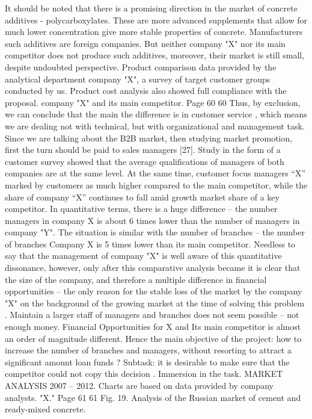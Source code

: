 It should be noted that there is a promising direction in the market of concrete additives
- polycarboxylates. These are more advanced supplements that allow for much
lower concentration give more stable properties of concrete. Manufacturers
such additives are foreign companies. But neither company "X" nor its main competitor
does not produce such additives, moreover, their market is still small, despite
undoubted perspective.
Product comparison data provided by the analytical department
company "X", a survey of target customer groups conducted by us.
Product cost analysis also showed full compliance with the proposal.
company "X" and its main competitor.
Page 60
60
Thus, by exclusion, we can conclude that the main
the difference is in customer service , which means we are dealing not with technical, but with
organizational and management task.
Since we are talking about the B2B market, then studying market promotion, first
the turn should be paid to sales managers [27]. Study
in the form of a customer survey showed that the average qualifications of managers of both
companies are at the same level. At the same time, customer focus
managers “X” marked by customers as much higher compared to
the main competitor, while the share of company “X” continues to fall amid growth
market share of a key competitor.
In quantitative terms, there is a huge difference -- the number
managers in company X is about 6 times lower than the number of managers in
company "Y". The situation is similar with the number of branches -- the number of branches
Company X is 5 times lower than its main competitor. Needless to say
that the management of company "X" is well aware of this quantitative
dissonance, however, only after this comparative analysis became
it is clear that the size of the company, and therefore a multiple difference in financial
opportunities -- the only reason for the stable loss of the market by the company "X" on
the background of the growing market at the time of solving this problem .
Maintain a larger staff of managers and branches does not seem
possible -- not enough money. Financial Opportunities for X and Its
main competitor is almost an order of magnitude different.
Hence the main objective of the project: how to increase the number of
branches and managers, without resorting to attract a significant amount
loan funds ?
Subtask: it is desirable to make sure that the competitor could not copy
this decision .
Immersion in the task. MARKET ANALYSIS 2007 -- 2012.
Charts are based on data provided by company analysts.
"X."
Page 61
61
Fig. 19. Analysis of the Russian market of cement and ready-mixed concrete.
